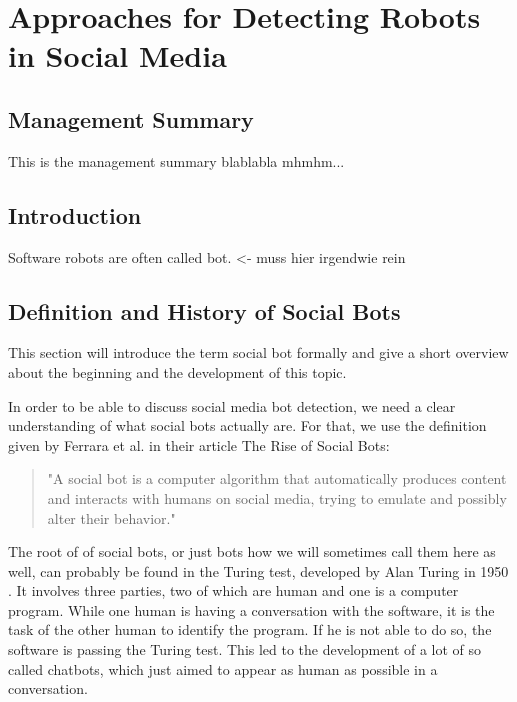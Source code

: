\newpage
\chapter{Approaches for Detecting Robots \\ in Social Media}

\section*{Management Summary}
This is the management summary blablabla mhmhm...

\section{Introduction}
Software robots are often called bot. <- muss hier irgendwie rein 

\section{Definition and History of Social Bots} 
This section will introduce the term social bot formally and give a short overview about the beginning and the development of this topic.

In order to be able to discuss social media bot detection, we need a clear understanding of what social bots actually are.  For that, we use the definition given by Ferrara et al. in their article The Rise of Social Bots:
\begin{quote}
	"A social bot is a computer algorithm that automatically produces content and interacts with humans on social media, trying to emulate and possibly alter their behavior." \cite{ferrara15}
\end{quote}

The root of of social bots, or just bots how we will sometimes call them here as well, can probably be found in the Turing test, developed by Alan Turing in 1950 \cite{turing}. It involves three parties, two of which are human and one is a computer program. While one human is having a conversation with the software, it is the task of the other human to identify the program. If he is not able to do so, the software is passing the Turing test. This led to the development of a lot of so called chatbots, which just aimed to appear as human as possible in a conversation.  

